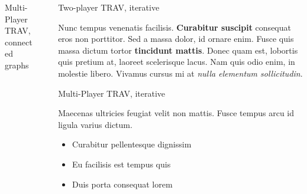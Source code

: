 \documentclass[final]{beamer}
\newlength{\sepwid}
\newlength{\onecolwid}
\newlength{\twocolwid}
\begin{document}
\begin{frame}[t]
\begin{columns}[t]
\begin{column}{\twocolwid}
\begin{columns}[t,totalwidth=\twocolwid]
\begin{column}{\onecolwid}
\begin{block}{Multi-Player TRAV, connected graphs}
\end{block}


\end{column} %

\end{columns} %

\end{column} %

\begin{column}{\sepwid}\end{column} %

\begin{column}{\onecolwid} %


\begin{block}{Two-player TRAV, iterative}

Nunc tempus venenatis facilisis. \textbf{Curabitur suscipit} consequat eros non porttitor. Sed a massa dolor, id ornare enim. Fusce quis massa dictum tortor \textbf{tincidunt mattis}. Donec quam est, lobortis quis pretium at, laoreet scelerisque lacus. Nam quis odio enim, in molestie libero. Vivamus cursus mi at \textit{nulla elementum sollicitudin}.

\end{block}


\begin{block}{Multi-Player TRAV, iterative}

Maecenas ultricies feugiat velit non mattis. Fusce tempus arcu id ligula varius dictum. 
\begin{itemize}
\item Curabitur pellentesque dignissim
\item Eu facilisis est tempus quis
\item Duis porta consequat lorem
\end{itemize}

\end{block}


\end{column}
\end{columns}
\end{frame}
\end{document}
